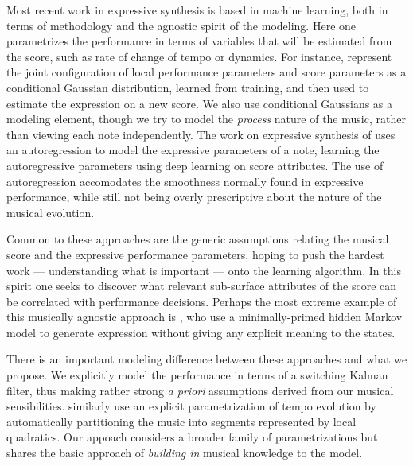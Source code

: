 \documentclass[aoas]{imsart}
\begin{document}
Most recent work in expressive synthesis is based in machine
learning, both in terms of methodology and the agnostic spirit of the
modeling.  Here one parametrizes the performance in terms of variables
that will be estimated from the score, such as rate of change of tempo
or dynamics.  For instance, \citet{Flossman} represent the joint
configuration of local performance parameters and score parameters as
a conditional Gaussian distribution, learned from training, and then
used to estimate the expression on a new score.  We also use
conditional Gaussians as a modeling element, though we try to model
the {\em process} nature of the music, rather than viewing each note
independently.  The work on expressive synthesis of
\citet{Maezawa} uses an autoregression to model the expressive
parameters of a note, learning the autoregressive parameters using
deep learning on score attributes.  The use of autoregression
accomodates the smoothness normally found in expressive performance,
while still not being overly prescriptive about the nature of the
musical evolution.

Common to these approaches are the generic assumptions relating the
musical score and the expressive performance parameters, hoping to
push the hardest work --- understanding what is important --- onto the
learning algorithm.  In this spirit one seeks to discover what
relevant sub-surface attributes of the score can be correlated with
performance decisions.  Perhaps the most extreme example of this
musically agnostic approach is \citet{Grindlay}, who use a
minimally-primed hidden Markov model to generate expression without
giving any explicit meaning to the states.

There is an important
modeling difference between these approaches and what we propose.  We
explicitly model the performance in terms of a switching Kalman
filter, thus making rather strong {\em a priori} assumptions derived
from our musical sensibilities.
\citet{Chew} similarly use an
explicit parametrization of tempo evolution by automatically
partitioning the music into segments represented by local quadratics.
Our appoach considers a broader family of parametrizations but shares
the basic approach of {\em building in} musical knowledge to the
model.
\end{document}
